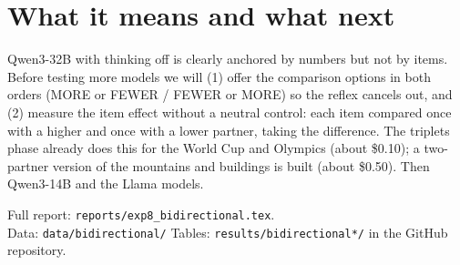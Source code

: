 \documentclass[11pt,a4paper]{article}
\begin{document}
\section*{What it means and what next}
Qwen3-32B with thinking off is clearly anchored by numbers but not by items. Before testing more models we will (1) offer the comparison options in both orders (MORE or FEWER / FEWER or MORE) so the reflex cancels out, and (2) measure the item effect without a neutral control: each item compared once with a higher and once with a lower partner, taking the difference. The triplets phase already does this for the World Cup and Olympics (about \$0.10); a two-partner version of the mountains and buildings is built (about \$0.50). Then Qwen3-14B and the Llama models.

\vfill
{\small Full report: \texttt{reports/exp8\_bidirectional.tex}.\\ Data: \texttt{data/bidirectional/} \textperiodcentered{} Tables: \texttt{results/bidirectional*/} in the GitHub repository.}
\end{document}
